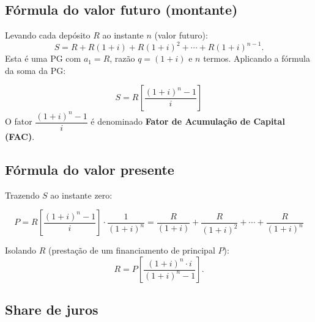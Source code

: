 \begin{center}
\end{center}

\subsection{Fórmula do valor futuro (montante)}

Levando cada depósito $R$ ao instante $n$ (valor futuro):
\[
  S = R + R(1+i) + R(1+i)^2 + \cdots + R(1+i)^{n-1}.
\]
Esta é uma PG com $a_1 = R$, razão $q = (1+i)$ e $n$ termos. Aplicando a fórmula da soma da PG:
\begin{resultado}
\[
  \boxed{S = R\left[\frac{(1+i)^n - 1}{i}\right]}
\]
O fator $\dfrac{(1+i)^n-1}{i}$ é denominado \textbf{Fator de Acumulação de Capital (FAC)}.
\end{resultado}

\subsection{Fórmula do valor presente}

Trazendo $S$ ao instante zero:
\begin{resultado}
\[
  \boxed{P = R\left[\frac{(1+i)^n - 1}{i}\right] \cdot \frac{1}{(1+i)^n}
           = \frac{R}{(1+i)} + \frac{R}{(1+i)^2} + \cdots + \frac{R}{(1+i)^n}}
\]
\end{resultado}

Isolando $R$ (prestação de um financiamento de principal $P$):
\[
  R = P\left[\frac{(1+i)^n \cdot i}{(1+i)^n - 1}\right].
\]

\subsection*{Share de juros}

